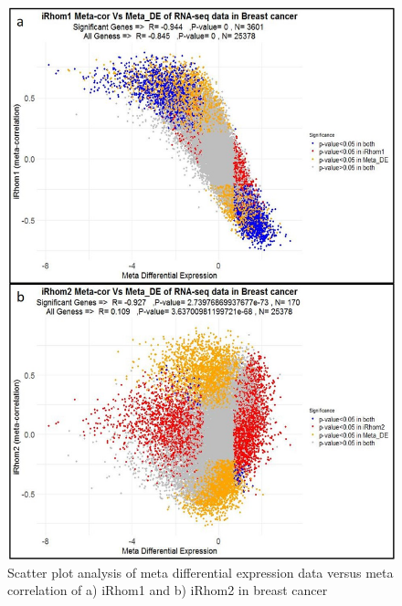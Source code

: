 \documentclass[fleqn,10pt,lineno]{wlpeerj}
\begin{document}
\begin{figure}[ht]
\centering
\includegraphics[width=\linewidth]{scatter-plot.jpg}
\caption{Scatter plot analysis of meta differential expression data versus meta correlation of a) iRhom1 and b) iRhom2 in breast cancer}
\label{fig:scatter-plot}
\end{figure}
\end{document}

